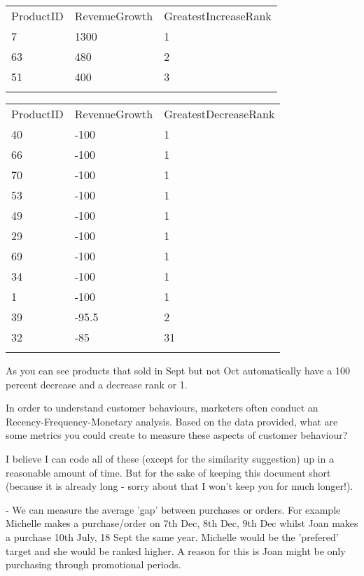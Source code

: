 \documentclass[11pt]{exam}
\newcommand{\headcol}{\rowcolor{tableheadcolor}} %
\newcommand{\topline}{\arrayrulecolor{black}\specialrule{0.1em}{\abovetopsep}{0pt}%
            \arrayrulecolor{tableheadcolor}\specialrule{\belowrulesep}{0pt}{0pt}%
            \arrayrulecolor{black}}
\newcommand{\midline}{\arrayrulecolor{tableheadcolor}\specialrule{\aboverulesep}{0pt}{0pt}%
            \arrayrulecolor{black}\specialrule{\lightrulewidth}{0pt}{0pt}%
            \arrayrulecolor{white}\specialrule{\belowrulesep}{0pt}{0pt}%
            \arrayrulecolor{black}}
\newcommand{\bottomlinec}{\arrayrulecolor{tablerowcolor}\specialrule{\aboverulesep}{0pt}{0pt}%
            \arrayrulecolor{black}\specialrule{\heavyrulewidth}{0pt}{\belowbottomsep}}%
\begin{document}
\begin{questions}
\begin{solution}
{\begin{center}
\renewcommand{\arraystretch}{1.5}
\begin{tabular}{p{2cm} p{4cm} p{4cm}}
  \topline
  \headcol ProductID & RevenueGrowth & GreatestIncreaseRank\\
  \midline
7 &1300 & 1 \\
63 & 480 & 2 \\
51 & 400 & 3 \\
  \bottomlinec
\end{tabular}
\end{center}


\begin{center}
\renewcommand{\arraystretch}{1.5}
\begin{tabular}{p{2cm} p{4cm} p{4cm}}
  \topline
  \headcol ProductID & RevenueGrowth & GreatestDecreaseRank\\
  \midline
40 &-100 & 1 \\
66 & -100 & 1 \\
70 &-100 & 1 \\
53 & -100 & 1 \\
49 &-100 & 1 \\
29 & -100 & 1 \\
69 &-100 & 1 \\
34 & -100 & 1 \\
1 & -100& 1 \\
39 &-95.5 & 2 \\
32 &-85&31 \\
  \bottomlinec
\end{tabular}
\end{center}
As you can see products that sold in Sept but not Oct automatically have a 100 percent decrease and a decrease rank or 1.

}
\end{solution}

\newpage
{\selectfont
\question In order to understand customer behaviours, marketers often conduct an Recency-Frequency-Monetary analysis. Based on the data provided, what are some metrics you could create to measure these aspects of customer behaviour?}

\begin{solution}
{\selectfont
I believe I can code all of these (except for the similarity suggestion) up in a reasonable amount of time. But for the sake of keeping this document short (because it is already long - sorry about that I won't keep you for much longer!).

\vspace{3mm}
- We can measure the average 'gap' between purchases or orders. For example Michelle makes a purchase/order on 7th Dec, 8th Dec, 9th Dec whilst Joan makes a purchase 10th July, 18 Sept the same year. Michelle would be the 'prefered' target and she would be ranked higher. A reason for this is Joan might be only purchasing through promotional periods.

}
\end{solution}
\end{questions}
\end{document}
